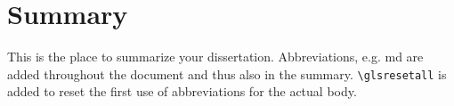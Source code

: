 \chapter*{Summary}

This is the place to summarize your dissertation. Abbreviations, e.g. \gls{md} are added throughout the document and thus also in the summary. \verb=\glsresetall= is added to reset the first use of abbreviations for the actual body.

\glsresetall